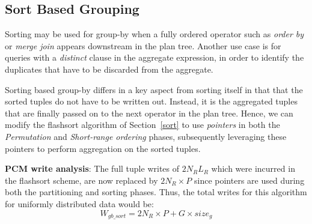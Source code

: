\subsection{Sort Based Grouping}

Sorting may be used for group-by when a fully ordered operator such
as \textit{order by} or \textit{merge join} appears downstream in the plan
tree. Another use case is for queries with a \textit{distinct} clause
in the aggregate expression, in order to identify the duplicates that have
to be discarded from the aggregate.  

Sorting based group-by differs in a key aspect from sorting itself
in that that the sorted tuples do not have to be written out. Instead, it
is the aggregated tuples that are finally passed on to the next operator
in the plan tree. Hence, we can modify the flashsort algorithm of
Section~\ref{sort} to use \emph{pointers} in both the
\textit{Permutation} and \textit{Short-range ordering} phases, subsequently leveraging these
pointers to perform aggregation on the sorted tuples. 

\textbf{PCM write analysis}: The full tuple writes of $2 N_R L_R$
which were incurred in the flashsort scheme, are
now replaced by $2N_R \times P$ since pointers are used during
both the partitioning and sorting phases. Thus, the total writes for this
algorithm for uniformly distributed data would be:
\begin{equation}
\label{eq:gb_sort}
W_{gb\_sort} = 2N_R \times P + G \times size_g
\end{equation}